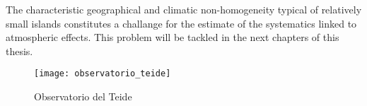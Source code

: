 The characteristic geographical and climatic non-homogeneity typical of
relatively small islands constitutes a challange for the estimate of the
systematics linked to atmospheric effects. This problem will be tackled in
the next chapters of this thesis.



\begin{figure}
        \centering
        \texttt{[image: observatorio\_teide]}
        \caption{Observatorio del Teide}
        \label{fig:observatorio_teide}
\end{figure}


